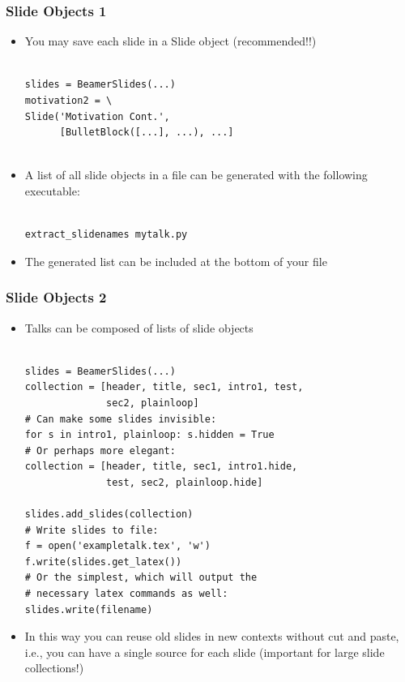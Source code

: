 \documentclass{beamer}
\begin{document}
\begin{frame}[fragile]
\frametitle{Slide Objects 1 }

\begin{block}

\begin{itemize}
\item You may save each slide in a Slide object (recommended!!)\begin{Verbatim}[fontsize=\footnotesize,tabsize=4,baselinestretch=0.85,fontfamily=tt,xleftmargin=7mm]

slides = BeamerSlides(...)
motivation2 = \
Slide('Motivation Cont.',
      [BulletBlock([...], ...), ...]
   
\end{Verbatim}

\item A list of all slide objects in a file can be generated with the following executable:\begin{Verbatim}[fontsize=\footnotesize,tabsize=4,baselinestretch=0.85,fontfamily=tt,xleftmargin=7mm]

extract_slidenames mytalk.py
\end{Verbatim}

\item The generated list can be included at the bottom of your file
\end{itemize}

\end{block}

\end{frame}

\begin{frame}[fragile]
\frametitle{Slide Objects 2 }

\begin{block}

\begin{itemize}
\item Talks can be composed of lists of slide objects\begin{Verbatim}[fontsize=\footnotesize,tabsize=4,baselinestretch=0.85,fontfamily=tt,xleftmargin=7mm]

slides = BeamerSlides(...)
collection = [header, title, sec1, intro1, test, 
              sec2, plainloop]
# Can make some slides invisible:
for s in intro1, plainloop: s.hidden = True
# Or perhaps more elegant:
collection = [header, title, sec1, intro1.hide, 
              test, sec2, plainloop.hide]

slides.add_slides(collection)
# Write slides to file:
f = open('exampletalk.tex', 'w')
f.write(slides.get_latex())
# Or the simplest, which will output the
# necessary latex commands as well:
slides.write(filename)
\end{Verbatim}

\item In this way you can reuse old slides in new contexts without cut and paste, i.e., you can have a single source for each slide (important for large slide collections!)
\end{itemize}

\end{block}

\end{frame}
\end{document}
